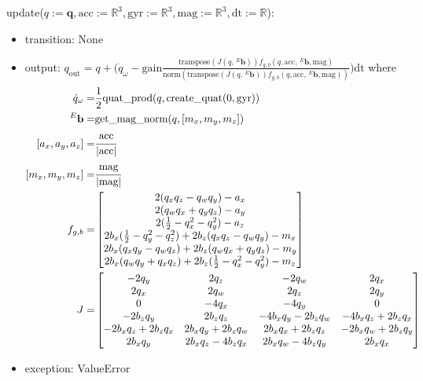 \documentclass[12pt, titlepage]{article}
\begin{document}
\noindent update($q:=\mathbf{q}, \text{acc}:=\mathbb{R}^3, \text{gyr}:=\mathbb{R}^3,
\text{mag}:=\mathbb{R}^3, \text{dt}:=\mathbb{R}$):
\begin{itemize}
\item transition: None
\item output: $q_\text{out} =  q + \Big( \dot{q}_{\omega} - \text{gain}\frac{\text{transpose}(J( q,
\,^E\mathbf{b}))f_{g,b}( q, \text{acc}, \,^E\mathbf{b}, \text{mag})}{\text{norm}(\text{transpose}(J(
q, \,^E\mathbf{b}))f_{g,b}( q, \text{acc}, \,^E\mathbf{b}, \text{mag}))}\Big) \text{dt}$ where
\begin{align*}
  \dot{q}_{\omega} =& \frac{1}{2} \text{quat\_prod}(q, \text{create\_quat}(0, \text{gyr})) \\
  \,^E\mathbf{b} =& \text{get\_mag\_norm}(q, [m_x, m_y, m_z])\\
  [a_x, a_y, a_z] =& \cfrac{\text{acc}}{|\text{acc}|} \\
  [m_x, m_y, m_z] =& \cfrac{\text{mag}}{|\text{mag}|} \\
  f_{g,b} =& \begin{bmatrix}
    2(q_xq_z-q_wq_y)-a_x \\
    2(q_wq_x+q_yq_z)-a_y \\
    2(\frac{1}{2}-q_x^2-q_y^2)-a_z \\
    2b_x(\frac{1}{2}-q_y^2-q_z^2) + 2b_z(q_xq_z-q_wq_y)-m_x \\
    2b_x(q_xq_y-q_wq_z) + 2b_z(q_wq_x+q_yq_z)-m_y \\
    2b_x(q_wq_y+q_xq_z) + 2b_z(\frac{1}{2}-q_x^2-q_y^2)-m_z
    \end{bmatrix} \\
    J =& \begin{bmatrix}
      -2q_y & 2q_z & -2q_w & 2q_x \\
      2q_x & 2q_w & 2q_z & 2q_y \\
      0 & -4q_x & -4q_y & 0 \\
      -2b_zq_y          & 2b_zq_z         & -4b_xq_y-2b_zq_w & -4b_xq_z+2b_zq_x \\
      -2b_xq_z+2b_zq_x  & 2b_xq_y+2b_zq_w & 2b_xq_x+2b_zq_z  & -2b_xq_w+2b_zq_y \\
      2b_xq_y           & 2b_xq_z-4b_zq_x & 2b_xq_w-4b_zq_y  & 2b_xq_x
      \end{bmatrix}\\
\end{align*}
\item exception: ValueError
\end{itemize}
\end{document}
